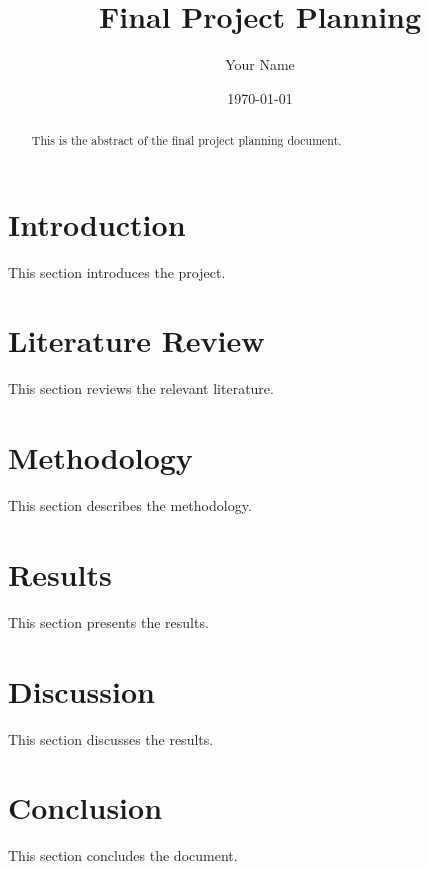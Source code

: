 \documentclass{article}
\title{Final Project Planning}
\author{Your Name}
\date{\today}
\begin{document}
\maketitle

\begin{abstract}
This is the abstract of the final project planning document.
\end{abstract}

\section{Introduction}
This section introduces the project.

\section{Literature Review}
This section reviews the relevant literature.

\section{Methodology}
This section describes the methodology.

\section{Results}
This section presents the results. \cite{demaine2002tetrishardapproximate}

\section{Discussion}
This section discusses the results.

\section{Conclusion}
This section concludes the document.



\end{document}
